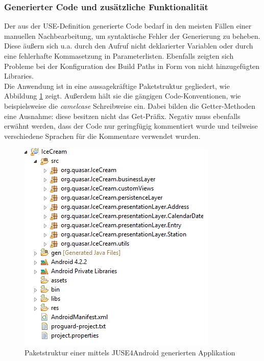 \documentclass[a4paper,twoside]{article}
\begin{document}

\subsubsection{Generierter Code und zusätzliche Funktionalität}
Der aus der USE-Definition generierte Code bedarf in den meisten Fällen einer manuellen Nachbearbeitung, um syntaktische Fehler der Generierung zu beheben. Diese äußern sich u.a. durch den Aufruf nicht deklarierter Variablen oder durch eine fehlerhafte Kommasetzung in Parameterlisten. 
Ebenfalls zeigten sich Probleme bei der Konfiguration des Build Paths in Form von nicht hinzugefügten Libraries.\\
Die Anwendung ist in eine aussagekräftige Paketstruktur gegliedert, wie Abbildung \ref{fig:Grafik4} zeigt. Außerdem hält sie die gängigen Code-Konventionen, wie beispielsweise die \textit{camelcase} Schreibweise ein. Dabei bilden die Getter-Methoden eine Ausnahme: diese besitzen nicht das Get-Präfix. Negativ muss ebenfalls erwähnt werden, dass der Code nur geringfügig kommentiert wurde und teilweise verschiedene Sprachen für die Kommentare verwendet wurden. %
\begin{figure}[!h]
	\centering
	\includegraphics[scale=.6]{pics/Paket.png}
	\caption{Paketstruktur einer mittels JUSE4Android generierten Applikation}
	\label{fig:Grafik4}
\end{figure}
\end{document}
